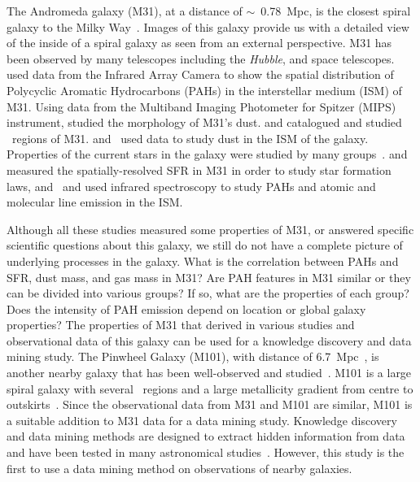 The Andromeda galaxy (M31), at a distance of $\sim$~0.78~Mpc, is the closest spiral galaxy to the Milky Way~\citep{McConnachie05}.
Images of this galaxy provide us with a detailed view of the inside of a spiral galaxy as seen from an external perspective.
M31 has been observed by many telescopes including the {\textit {Hubble}}, \Spitzer and \Herschel space telescopes. %
\cite{Barmby06} used data from the \Spitzer Infrared Array Camera \citep[IRAC;][]{Fazio04} to show the spatial distribution of Polycyclic Aromatic Hydrocarbons (PAHs) in the interstellar medium (ISM) of M31.
Using data from the Multiband Imaging Photometer for Spitzer (MIPS) instrument, \cite{Gordon06} studied the morphology of M31's dust.
\cite{Azimlu11} and \cite{Sanders12} catalogued and studied \hii~regions of M31.
\cite{Draine14, Mattsson14, Viaene14, Smith12} and~\cite{Fritz12} used \Herschel data to study dust in the ISM of the galaxy.
Properties of the current stars in the galaxy were studied by many groups~\citep[e.g.][and references therein]{Tamm12,Dalcanton12,Massey07}.
\cite{Rahmani16, Ford13} and \cite{Tabatabaei10} measured the spatially-resolved SFR in M31 in order to study star formation laws, and~\cite{Dim15} and \cite{Kapala15} used infrared spectroscopy to study PAHs and atomic and molecular line emission in the ISM.

Although all these studies measured some properties of M31, or answered specific scientific questions about this galaxy, we still do not have a complete picture of underlying processes in the galaxy.
What is the correlation between PAHs and SFR, dust mass, and gas mass in M31? 
Are PAH features in M31 similar or they can be divided into various groups? If so, what are the properties of each group?
Does the intensity of PAH emission depend on location or global galaxy properties? 
The properties of M31 that derived in various studies and observational data of this galaxy can be used for a knowledge discovery and data mining study.
The Pinwheel Galaxy (M101), with distance of 6.7~Mpc~\citep{Freedman01}, is another nearby galaxy that has been well-observed and studied~\citep[e.g. ][and references therein]{Kennicutt11,Dale09, Leroy08, Gordon08}.
M101 is a large spiral galaxy with several \hii~regions and a large metallicity gradient from centre to outskirts~\citep{Kennicutt03}.
Since the observational data from M31 and M101 are similar, M101 is a suitable addition to M31 data for a data mining study. 
Knowledge discovery and data mining methods are designed to extract hidden information from data and have been tested in many astronomical studies~\citep[e.g.][and references therein]{Ball10}.
However, this study is the first to use a data mining method on observations of nearby galaxies.

